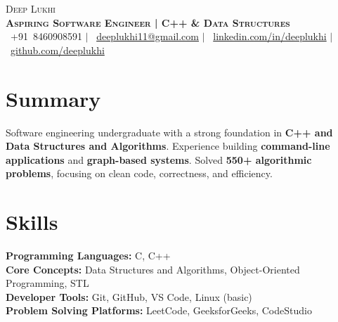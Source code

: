 \documentclass[letterpaper,11pt]{article}
\begin{document}
\begin{center}
    {\Huge \scshape Deep Lukhi} \\ \vspace{4pt}
    \textbf{\Large \scshape Aspiring Software Engineer | C++ \& Data Structures} \\ \vspace{8pt}
    \small
    \faPhone\ +91~8460908591 \quad $|$ \quad
    \faEnvelope\ \href{mailto:deeplukhi11@gmail.com}{deeplukhi11@gmail.com} \quad $|$ \quad
    \faLinkedin\ \href{https://www.linkedin.com/in/deeplukhi/}{linkedin.com/in/deeplukhi} \quad $|$ \quad
    \faGithub\ \href{https://github.com/deeplukhi}{github.com/deeplukhi}
\end{center}

\section{Summary}
Software engineering undergraduate with a strong foundation in \textbf{C++ and Data Structures and Algorithms}. Experience building \textbf{command-line applications} and \textbf{graph-based systems}. Solved \textbf{550+ algorithmic problems}, focusing on clean code, correctness, and efficiency.

\section{Skills}
\textbf{Programming Languages:} C, C++ \\
\textbf{Core Concepts:} Data Structures and Algorithms, Object-Oriented Programming, STL \\
\textbf{Developer Tools:} Git, GitHub, VS Code, Linux (basic) \\
\textbf{Problem Solving Platforms:} LeetCode, GeeksforGeeks, CodeStudio

\end{document}
